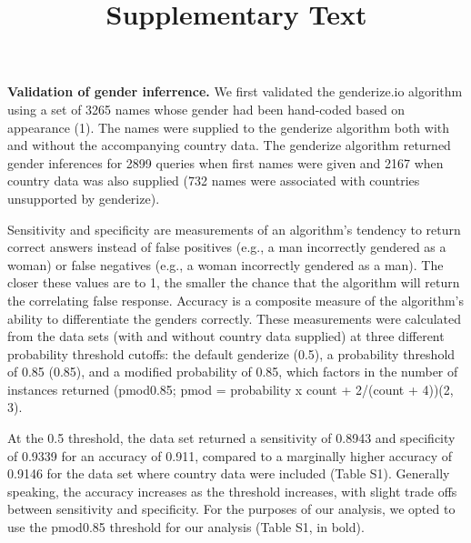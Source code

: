 \documentclass[11pt,]{article}
\title{Supplementary Text}
\author{}
\date{\vspace{-2.5em}}
\begin{document}
\maketitle

\textbf{Validation of gender inferrence.} We first validated the
genderize.io algorithm using a set of 3265 names whose gender had been
hand-coded based on appearance (1). The names were supplied to the
genderize algorithm both with and without the accompanying country data.
The genderize algorithm returned gender inferences for 2899 queries when
first names were given and 2167 when country data was also supplied (732
names were associated with countries unsupported by genderize).

Sensitivity and specificity are measurements of an algorithm's tendency
to return correct answers instead of false positives (e.g., a man
incorrectly gendered as a woman) or false negatives (e.g., a woman
incorrectly gendered as a man). The closer these values are to 1, the
smaller the chance that the algorithm will return the correlating false
response. Accuracy is a composite measure of the algorithm's ability to
differentiate the genders correctly. These measurements were calculated
from the data sets (with and without country data supplied) at three
different probability threshold cutoffs: the default genderize (0.5), a
probability threshold of 0.85 (0.85), and a modified probability of
0.85, which factors in the number of instances returned (pmod0.85; pmod
= probability x count + 2/(count + 4))(2, 3).

At the 0.5 threshold, the data set returned a sensitivity of 0.8943 and
specificity of 0.9339 for an accuracy of 0.911, compared to a marginally
higher accuracy of 0.9146 for the data set where country data were
included (Table S1). Generally speaking, the accuracy increases as the
threshold increases, with slight trade offs between sensitivity and
specificity. For the purposes of our analysis, we opted to use the
pmod0.85 threshold for our analysis (Table S1, in bold).
\end{document}
